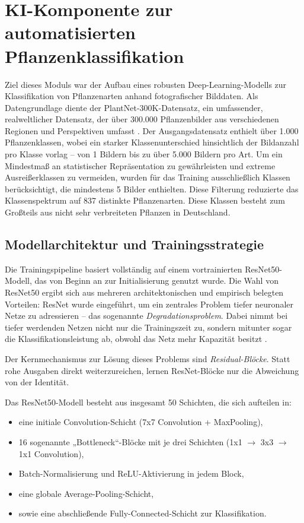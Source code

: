 \section{KI-Komponente zur automatisierten Pflanzenklassifikation}
Ziel dieses Moduls war der Aufbau eines robusten Deep-Learning-Modells zur Klassifikation von Pflanzenarten anhand fotografischer Bilddaten. Als Datengrundlage diente der PlantNet-300K-Datensatz, ein umfassender, realweltlicher Datensatz, der über 300.000 Pflanzenbilder aus verschiedenen Regionen und Perspektiven umfasst \cite{Affouard2017}. Der Ausgangsdatensatz enthielt über 1.000 Pflanzenklassen, wobei ein starker Klassenunterschied hinsichtlich der Bildanzahl pro Klasse vorlag – von 1 Bildern bis zu über 5.000 Bildern pro Art. Um ein Mindestmaß an statistischer Repräsentation zu gewährleisten und extreme Ausreißerklassen zu vermeiden, wurden für das Training ausschließlich Klassen berücksichtigt, die mindestens 5 Bilder enthielten. Diese Filterung reduzierte das Klassenspektrum auf 837 distinkte Pflanzenarten.
Diese Klassen besteht zum Großteils aus nicht sehr verbreiteten Pflanzen in Deutschland.

\subsection{Modellarchitektur und Trainingsstrategie}

Die Trainingspipeline basiert vollständig auf einem vortrainierten \ac{ResNet50}-Modell, das von Beginn an zur Initialisierung genutzt wurde. Die Wahl von \ac{ResNet50} ergibt sich aus mehreren architektonischen und empirisch belegten Vorteilen: \ac{ResNet} wurde eingeführt, um ein zentrales Problem tiefer neuronaler Netze zu adressieren – das sogenannte \emph{Degradationsproblem}. Dabei nimmt bei tiefer werdenden Netzen nicht nur die Trainingszeit zu, sondern mitunter sogar die Klassifikationsleistung ab, obwohl das Netz mehr Kapazität besitzt \cite{He2015}.

Der Kernmechanismus zur Lösung dieses Problems sind \emph{Residual-Blöcke}. Statt rohe Ausgaben direkt weiterzureichen, lernen ResNet-Blöcke nur die Abweichung von der Identität\cite{He2015}.

Das \ac{ResNet50}-Modell besteht aus insgesamt 50 Schichten, die sich aufteilen in:
\begin{itemize}
	\item eine initiale Convolution-Schicht (7x7 Convolution + MaxPooling),
	\item 16 sogenannte „Bottleneck“-Blöcke mit je drei Schichten (1x1 $\rightarrow$ 3x3 $\rightarrow$ 1x1 Convolution),
	\item Batch-Normalisierung und ReLU-Aktivierung in jedem Block,
	\item eine globale Average-Pooling-Schicht,
	\item sowie eine abschließende Fully-Connected-Schicht zur Klassifikation.
\end{itemize}

